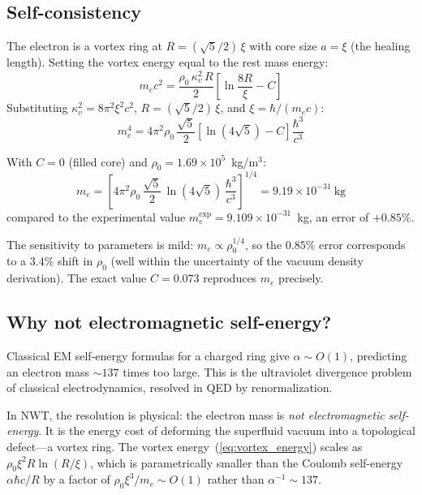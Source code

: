 \documentclass[11pt,a4paper]{article}
\begin{document}
\subsection{Self-consistency}

The electron is a vortex ring at $R = (\sqrt{5}/2)\,\xi$ with core
size $a = \xi$ (the healing length).  Setting the vortex energy equal
to the rest mass energy:
\begin{equation}
  m_e c^2 = \frac{\rho_0\,\kappa_v^2\,R}{2}
    \left[\ln\frac{8R}{\xi} - C\right]
  \label{eq:self_consist}
\end{equation}
Substituting $\kappa_v^2 = 8\pi^2\xi^2 c^2$,
$R = (\sqrt{5}/2)\,\xi$, and $\xi = \hbar/(m_e c)$:
\begin{equation}
  m_e^4 = 4\pi^2\rho_0\,\frac{\sqrt{5}}{2}
    \left[\ln(4\sqrt{5}) - C\right]
    \frac{\hbar^3}{c^3}
  \label{eq:me_formula}
\end{equation}

With $C = 0$ (filled core) and $\rho_0 = 1.69 \times 10^5$~kg/m$^3$:
\begin{equation}
  \boxed{m_e = \left[4\pi^2\rho_0\,\frac{\sqrt{5}}{2}\,
    \ln(4\sqrt{5})\,\frac{\hbar^3}{c^3}\right]^{1/4}
    = 9.19 \times 10^{-31}~\text{kg}}
  \label{eq:me_result}
\end{equation}
compared to the experimental value
$m_e^{\text{exp}} = 9.109 \times 10^{-31}$~kg, an error of
$+0.85\%$.

The sensitivity to parameters is mild: $m_e \propto \rho_0^{1/4}$,
so the $0.85\%$ error corresponds to a $3.4\%$ shift in $\rho_0$
(well within the uncertainty of the vacuum density derivation).
The exact value $C = 0.073$ reproduces $m_e$ precisely.


\subsection{Why not electromagnetic self-energy?}

Classical EM self-energy formulas for a charged ring give
$\alpha \sim O(1)$, predicting an electron mass $\sim 137$ times
too large.  This is the ultraviolet divergence problem of classical
electrodynamics, resolved in QED by renormalization.

In NWT, the resolution is physical: the electron mass is
\emph{not electromagnetic self-energy}.  It is the energy cost of
deforming the superfluid vacuum into a topological defect---a
vortex ring.  The vortex energy~(\ref{eq:vortex_energy}) scales
as $\rho_0 \xi^2 R \ln(R/\xi)$, which is parametrically smaller
than the Coulomb self-energy $\alpha\hbar c/R$ by a factor of
$\rho_0\xi^3/m_e \sim O(1)$ rather than $\alpha^{-1} \sim 137$.
\end{document}
